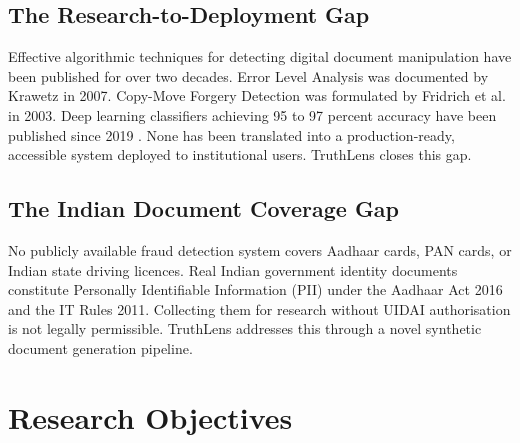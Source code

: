 \documentclass[12pt,a4paper,oneside]{report}
\begin{document}
\subsection{The Research-to-Deployment Gap}

Effective algorithmic techniques for detecting digital document manipulation
have been published for over two decades. Error Level Analysis was documented
by Krawetz \cite{krawetz2007} in 2007. Copy-Move Forgery Detection was
formulated by Fridrich et al. \cite{fridrich2003} in 2003. Deep learning
classifiers achieving 95 to 97 percent accuracy have been published since
2019 \cite{jain2021}. None has been translated into a production-ready,
accessible system deployed to institutional users. TruthLens closes this gap.

\subsection{The Indian Document Coverage Gap}

No publicly available fraud detection system covers Aadhaar cards, PAN cards,
or Indian state driving licences. Real Indian government identity documents
constitute Personally Identifiable Information (PII) under the Aadhaar Act 2016
and the IT Rules 2011. Collecting them for research without UIDAI authorisation
is not legally permissible. TruthLens addresses this through a novel synthetic
document generation pipeline.

\section{Research Objectives}
\end{document}
